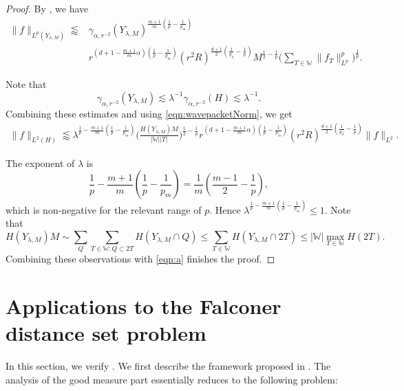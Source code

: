 \documentclass[11pt]{amsart}
\theoremstyle{definition}
\theoremstyle{remark}
\numberwithin{equation}{section}
\newcommand{\W}{\mathbb{W}}
\newcommand{\les}{\lesssim}
\newcommand{\less}{\lessapprox}
\newcommand{\la}{\lambda}
\begin{document}
\begin{proof}
 
By , we have 
\begin{align*}
	\| f\|_{L^p(Y_{\la,M})}  \less  &\gamma_{\alpha,r^{-2}}(Y_{\la,M})^{\frac{m+1}{m}(\frac{1}{p}-\frac{1}{p_m})}  \\ &r^{(d+1 - \frac{m+1}{m}\alpha)(\frac{1}{p}-\frac{1}{p_m})} (r^2 R)^{\frac{d+1}{2}(\frac{1}{p_d} -\frac{1}{p})}   M^{\frac{1}{2}-\frac{1}{p}}   \bigg( \sum_{T\in \W} \| f_T \|_{L^p}^p \bigg)^{\frac{1}{p}}.
\end{align*}

Note that 
\[  \gamma_{\alpha,r^{-2}}(Y_{\la,M}) \les \la^{-1} \gamma_{\alpha,r^{-2}}(H) \les \la^{-1}. \]
Combining these estimates and using \eqref{eqn:wavepacketNorm}, we get
\begin{equation}\label{eqn:a}
	\begin{split}
		\| f\|_{L^2(H)} \less  \la^{\frac{1}{p}-\frac{m+1}{m}(\frac{1}{p}-\frac{1}{p_m})} \Big(\frac{H(Y_{\la,M}) M}{|\W| |T| }\Big)^{\frac{1}{2}-\frac{1}{p}} 
		r^{(d+1 - \frac{m+1}{m}\alpha)(\frac{1}{p}-\frac{1}{p_m})} (r^2 R)^{\frac{d+1}{2}(\frac{1}{p_d} -\frac{1}{p})}  \| f\|_{L^2}.
	\end{split}
\end{equation}

The exponent of $\lambda$ is
\[
\frac1p-\frac{m+1}{m}\left(\frac1p-\frac1{p_m}\right)
=
\frac1m\left(\frac{m-1}{2}-\frac1p\right),
\]
which is non-negative for the relevant range of $p$. Hence $\la^{\frac{1}{p}-\frac{m+1}{m}(\frac{1}{p}-\frac{1}{p_m})} \leq 1$. Note that
\[ H(Y_{\la,M}) M \sim \sum_{Q} \sum_{T\in \W: Q\subset 2T} H(Y_{\la,M} \cap Q) \leq  \sum_{T\in \W}  H(Y_{\la,M} \cap 2T)\leq | \W| \max_{T\in \W} H(2T). \]
Combining these observations with \eqref{eqn:a} finishes the proof.
\end{proof}

\section{Applications to the Falconer distance set problem}\label{sec:Falconer}
In this section, we verify . We first describe the framework proposed in \cite{du2023weighted}. The analysis of the good measure part essentially reduces to the following problem:
\end{document}
